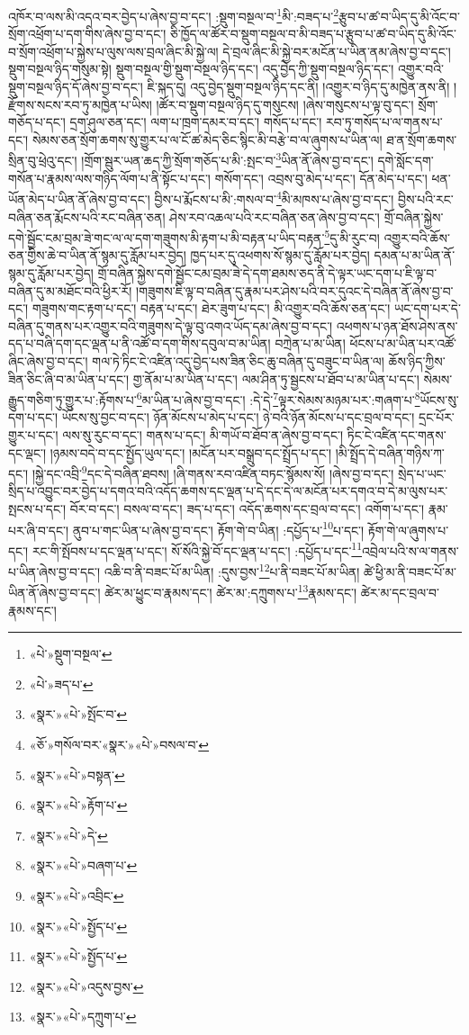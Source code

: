 འཁོར་བ་ལས་མི་འདའ་བར་བྱེད་པ་ཞེས་བྱ་བ་དང་། :སྡུག་བསྔལ་བ་\footnote{«པེ་»སྡུག་བསྔལ་}མི་:བཟད་པ་\footnote{«པེ་»ཟད་པ་}རྩུབ་པ་ཚ་བ་ཡིད་དུ་མི་འོང་བ་སྲོག་འཕྲོག་པ་དག་གིས་ཞེས་བྱ་བ་དང་། ཅི་ཁྱོད་ལ་ཚོར་བ་སྡུག་བསྔལ་བ་མི་བཟད་པ་རྩུབ་པ་ཚ་བ་ཡིད་དུ་མི་འོང་བ་སྲོག་འཕྲོག་པ་སྐྱེས་པ་ལུས་ལས་བྲལ་ཞིང་མི་སྐྱེ་ལ། དེ་བྲལ་ཞིང་མི་སྐྱེ་བར་མངོན་པ་ཡིན་ནམ་ཞེས་བྱ་བ་དང་། སྡུག་བསྔལ་ཉིད་གསུམ་སྟེ། སྡུག་བསྔལ་གྱི་སྡུག་བསྔལ་ཉིད་དང་། འདུ་བྱེད་ཀྱི་སྡུག་བསྔལ་ཉིད་དང་། འགྱུར་བའི་སྡུག་བསྔལ་ཉིད་དོ་ཞེས་བྱ་བ་དང་། ཇི་སྐད་དུ། འདུ་བྱེད་སྡུག་བསྔལ་ཉིད་དང་ནི། །འགྱུར་བ་ཉིད་དུ་མཁྱེན་ནས་ནི། །རྫོགས་སངས་རབ་ཏུ་མཁྱེན་པ་ཡིས། །ཚོར་བ་སྡུག་བསྔལ་ཉིད་དུ་གསུངས། །ཞེས་གསུངས་པ་ལྟ་བུ་དང་། སྲོག་གཅོད་པ་དང་། དྲག་ཤུལ་ཅན་དང་། ལག་པ་ཁྲག་དམར་བ་དང་། གསོད་པ་དང་། རབ་ཏུ་གསོད་པ་ལ་གནས་པ་དང་། སེམས་ཅན་སྲོག་ཆགས་སུ་གྱུར་པ་ལ་ངོ་ཚ་མེད་ཅིང་སྙིང་མི་བརྩེ་བ་ལ་ཞུགས་པ་ཡིན་ལ། ཐ་ན་སྲོག་ཆགས་སྲིན་བུ་ཕྲེའུ་དང་། །གྲོག་སྦུར་ཡན་ཆད་ཀྱི་སྲོག་གཅོད་པ་མི་:སྤང་བ་\footnote{«སྣར་»«པེ་»སྤོང་བ་}ཡིན་ནོ་ཞེས་བྱ་བ་དང་། དགེ་སློང་དག་གསོན་པ་རྣམས་ལས་གཉིད་ལོག་པ་ནི་སྟོང་པ་དང་། གསོག་དང་། འབྲས་བུ་མེད་པ་དང་། དོན་མེད་པ་དང་། ཕན་ཡོན་མེད་པ་ཡིན་ནོ་ཞེས་བྱ་བ་དང་། བྱིས་པ་རྨོངས་པ་མི་:གསལ་བ་\footnote{«ཅོ་»གསོལ་བར་«སྣར་»«པེ་»བསལ་བ་}མི་མཁས་པ་ཞེས་བྱ་བ་དང་། བྱིས་པའི་རང་བཞིན་ཅན་རྨོངས་པའི་རང་བཞིན་ཅན། ཤེས་རབ་འཆལ་པའི་རང་བཞིན་ཅན་ཞེས་བྱ་བ་དང་། གྲོ་བཞིན་སྐྱེས་དགེ་སྦྱོང་ངམ་བྲམ་ཟེ་གང་ལ་ལ་དག་གཟུགས་མི་རྟག་པ་མི་བརྟན་པ་ཡིད་བརྟན་\footnote{«སྣར་»«པེ་»བསྟན་}དུ་མི་རུང་བ། འགྱུར་བའི་ཆོས་ཅན་གྱིས་ཆེ་བ་ཡིན་ནོ་སྙམ་དུ་རློམ་པར་བྱེད། ཁྱད་པར་དུ་འཕགས་སོ་སྙམ་དུ་རློམ་པར་བྱེད། དམན་པ་མ་ཡིན་ནོ་སྙམ་དུ་རློམ་པར་བྱེད། གྲོ་བཞིན་སྐྱེས་དགེ་སྦྱོང་ངམ་བྲམ་ཟེ་དེ་དག་ཐམས་ཅད་ནི་དེ་ལྟར་ཡང་དག་པ་ཇི་ལྟ་བ་བཞིན་དུ་མ་མཐོང་བའི་ཕྱིར་རོ། །གཟུགས་ཇི་ལྟ་བ་བཞིན་དུ་རྣམ་པར་ཤེས་པའི་བར་དུའང་དེ་བཞིན་ནོ་ཞེས་བྱ་བ་དང་། གཟུགས་གང་རྟག་པ་དང་། བརྟན་པ་དང་། ཐེར་ཟུག་པ་དང་། མི་འགྱུར་བའི་ཆོས་ཅན་དང་། ཡང་དག་པར་དེ་བཞིན་དུ་གནས་པར་འགྱུར་བའི་གཟུགས་དེ་ལྟ་བུ་འགའ་ཡོད་དམ་ཞེས་བྱ་བ་དང་། འཕགས་པ་ཉན་ཐོས་ཤེས་ནས་དད་པ་བཞི་དག་དང་ལྡན་པ་ནི་འཚོ་བ་དག་གིས་དབུལ་བ་མ་ཡིན། བཀྲེན་པ་མ་ཡིན། ཕོངས་པ་མ་ཡིན་པར་འཚོ་ཞིང་ཞེས་བྱ་བ་དང་། གལ་ཏེ་ཏིང་ངེ་འཛིན་འདུ་བྱེད་པས་ཟིན་ཅིང་ཆུ་བཞིན་དུ་བཟུང་བ་ཡིན་ལ། ཆོས་ཉིད་ཀྱིས་ཟིན་ཅིང་ཞི་བ་མ་ཡིན་པ་དང་། གྱ་ནོམ་པ་མ་ཡིན་པ་དང་། ལམ་ཤིན་ཏུ་སྦྱངས་པ་ཐོབ་པ་མ་ཡིན་པ་དང་། སེམས་རྒྱུད་གཅིག་ཏུ་གྱུར་པ་:རྟོགས་པ་\footnote{«སྣར་»«པེ་»རྟོག་པ་}མ་ཡིན་པ་ཞེས་བྱ་བ་དང་། :དེ་དེ་\footnote{«སྣར་»«པེ་»དེ་}ལྟར་སེམས་མཉམ་པར་:གཞག་པ་\footnote{«སྣར་»«པེ་»བཞག་པ་}ཡོངས་སུ་དག་པ་དང་། ཡོངས་སུ་བྱང་བ་དང་། ཉོན་མོངས་པ་མེད་པ་དང་། ཉེ་བའི་ཉོན་མོངས་པ་དང་བྲལ་བ་དང་། དྲང་པོར་གྱུར་པ་དང་། ལས་སུ་རུང་བ་དང་། གནས་པ་དང་། མི་གཡོ་བ་ཐོབ་ན་ཞེས་བྱ་བ་དང་། ཏིང་ངེ་འཛིན་དང་གནས་དང་ལྡང་། །ཉམས་བདེ་བ་དང་སྤྱོད་ཡུལ་དང་། །མངོན་པར་བསྒྲུབ་དང་སྤྲོད་པ་དང་། །མི་སྤྲོད་དེ་བཞིན་གཉིས་ཀ་དང་། །སྐྱེ་དང་འབྲི་\footnote{«སྣར་»«པེ་»འབྲིང་}དང་དེ་བཞིན་ཐབས། །ཞི་གནས་རབ་འཛིན་བཏང་སྙོམས་སོ། །ཞེས་བྱ་བ་དང་། སྲེད་པ་ཡང་སྲིད་པ་འབྱུང་བར་བྱེད་པ་དགའ་བའི་འདོད་ཆགས་དང་ལྡན་པ་དེ་དང་དེ་ལ་མངོན་པར་དགའ་བ་དེ་མ་ལུས་པར་སྤངས་པ་དང་། བོར་བ་དང་། བསལ་བ་དང་། ཟད་པ་དང་། འདོད་ཆགས་དང་བྲལ་བ་དང་། འགོག་པ་དང་། རྣམ་པར་ཞི་བ་དང་། ནུབ་པ་གང་ཡིན་པ་ཞེས་བྱ་བ་དང་། རྟོག་གེ་བ་ཡིན། :དཔྱོད་པ་\footnote{«སྣར་»«པེ་»སྤྱོད་པ་}པ་དང་། རྟོག་གེ་ལ་ཞུགས་པ་དང་། རང་གི་སྤོབས་པ་དང་ལྡན་པ་དང་། སོ་སོའི་སྐྱེ་བོ་དང་ལྡན་པ་དང་། :དཔྱོད་པ་དང་\footnote{«སྣར་»«པེ་»སྤྱོད་པ་}འབྲེལ་པའི་ས་ལ་གནས་པ་ཡིན་ཞེས་བྱ་བ་དང་། འཆི་བ་ནི་བཟང་པོ་མ་ཡིན། :དུས་བྱས་\footnote{«སྣར་»«པེ་»འདུས་བྱས་}པ་ནི་བཟང་པོ་མ་ཡིན། ཚེ་ཕྱི་མ་ནི་བཟང་པོ་མ་ཡིན་ནོ་ཞེས་བྱ་བ་དང་། ཚེར་མ་ཕྱུང་བ་རྣམས་དང་། ཚེར་མ་:དཀྲུགས་པ་\footnote{«སྣར་»«པེ་»དཀྲུག་པ་}རྣམས་དང་། ཚེར་མ་དང་བྲལ་བ་རྣམས་དང་། 